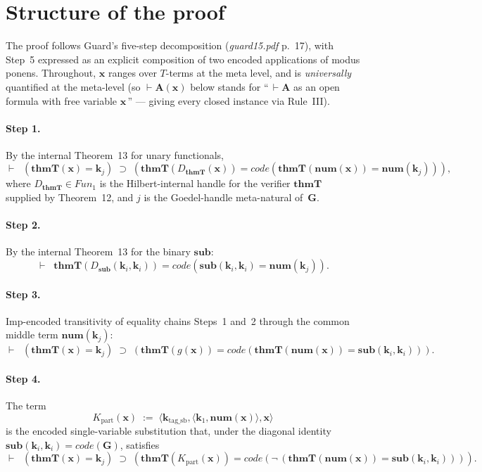 \documentclass[11pt]{article}
\theoremstyle{plain}
\theoremstyle{definition}
\theoremstyle{remark}
\newcommand{\code}[1]{\mathit{code}(#1)}
\newcommand{\sub}{\mathbf{sub}}
\newcommand{\thmT}{\mathbf{thmT}}
\newcommand{\num}{\mathbf{num}}
\newcommand{\seq}[1]{\langle #1 \rangle}
\newcommand{\Fun}{\mathit{Fun}}
\begin{document}
\section{Structure of the proof}

The proof follows Guard's five-step decomposition (\emph{guard15.pdf}
p.~17), with Step~5 expressed as an explicit composition of two encoded
applications of modus ponens.  Throughout, $\mathbf{x}$ ranges over
$T$-terms at the meta level, and is \emph{universally} quantified at
the meta-level (so $\vdash \mathbf{A}(\mathbf{x})$ below stands for
``\,$\vdash \mathbf{A}$ as an open formula with free variable
$\mathbf{x}$\,'' --- giving every closed instance via Rule~III).

\paragraph{Step 1.}  By the internal Theorem~13 for unary functionals,
\[
\vdash \;\;(\thmT(\mathbf{x}) = \mathbf{k}_j) \;\supset\; (\thmT(D_\thmT(\mathbf{x})) = \code{\thmT(\num(\mathbf{x})) = \num(\mathbf{k}_j)}),
\]
where $D_\thmT \in \Fun_1$ is the Hilbert-internal handle for the
verifier $\thmT$ supplied by Theorem~12, and $j$ is the Goedel-handle
meta-natural of~$\mathbf{G}$.

\paragraph{Step 2.}  By the internal Theorem~13 for the binary
$\sub$:
\[
\vdash \;\;\thmT(D_\sub(\mathbf{k}_i, \mathbf{k}_i)) = \code{\sub(\mathbf{k}_i, \mathbf{k}_i) = \num(\mathbf{k}_j)}.
\]

\paragraph{Step 3.}  Imp-encoded transitivity of equality chains
Steps~1 and~2 through the common middle term $\num(\mathbf{k}_j)$:
\[
\vdash \;\;(\thmT(\mathbf{x}) = \mathbf{k}_j) \;\supset\; (\thmT(g(\mathbf{x})) = \code{\thmT(\num(\mathbf{x})) = \sub(\mathbf{k}_i, \mathbf{k}_i)}).
\]

\paragraph{Step 4.}  The term
\[
K_{\mathrm{part}}(\mathbf{x}) \;:=\; \seq{\mathbf{k}_{\mathrm{tag\_sb}}, \seq{\mathbf{k}_1, \num(\mathbf{x})}, \mathbf{x}}
\]
is the encoded single-variable substitution that, under the diagonal
identity $\sub(\mathbf{k}_i, \mathbf{k}_i) = \code{\mathbf{G}}$,
satisfies
\[
\vdash \;\;(\thmT(\mathbf{x}) = \mathbf{k}_j) \;\supset\; (\thmT(K_{\mathrm{part}}(\mathbf{x})) = \code{\neg\,(\thmT(\num(\mathbf{x})) = \sub(\mathbf{k}_i, \mathbf{k}_i))}).
\]
\end{document}
